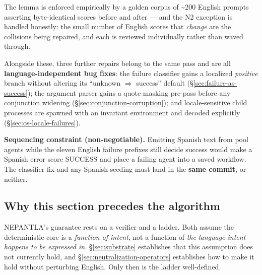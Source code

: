 The lemma is enforced empirically by a golden corpus of \textasciitilde{}200
English prompts asserting byte-identical scores before and after --- and the N2
exception is handled honestly: the small number of English scores that
\emph{change} are the collisions being repaired, and each is reviewed
individually rather than waved through.

Alongside these, three further repairs belong to the same pass and are all
\textbf{language-independent bug fixes}: the failure classifier gains a localized
\emph{positive} branch without altering its ``unknown $\Rightarrow$ success''
default (\S\ref{sec:failure-as-success}); the argument parser gains a
quote-masking pre-pass before any conjunction widening
(\S\ref{sec:conjunction-corruption}); and locale-sensitive child processes are
spawned with an invariant environment and decoded explicitly
(\S\ref{sec:os-locale-failures}).

\begin{keyinsight}
\textbf{Sequencing constraint (non-negotiable).} Emitting Spanish text from pool
agents while the eleven English failure prefixes still decide success would make
a Spanish error score SUCCESS and place a failing agent into a saved workflow.
The classifier fix and any Spanish seeding must land in the \textbf{same commit},
or neither.
\end{keyinsight}

\subsection{Why this section precedes the algorithm}
\label{sec:why-substrate-first}

NEPANTLA's guarantee rests on a verifier and a ladder. Both assume the
deterministic core is a \emph{function of intent}, not a function of \emph{the
language intent happens to be expressed in}. \S\ref{sec:substrate} establishes
that this assumption does not currently hold, and
\S\ref{sec:neutralization-operators} establishes how to make it hold without
perturbing English. Only then is the ladder well-defined.
